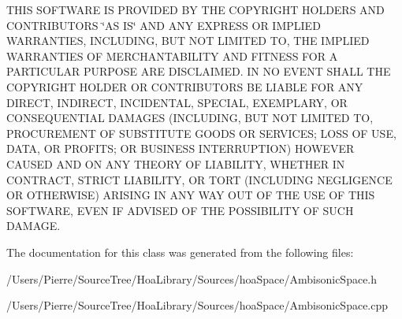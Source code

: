 T\-H\-I\-S S\-O\-F\-T\-W\-A\-R\-E I\-S P\-R\-O\-V\-I\-D\-E\-D B\-Y T\-H\-E C\-O\-P\-Y\-R\-I\-G\-H\-T H\-O\-L\-D\-E\-R\-S A\-N\-D C\-O\-N\-T\-R\-I\-B\-U\-T\-O\-R\-S \char`\"{}\-A\-S I\-S\char`\"{} A\-N\-D A\-N\-Y E\-X\-P\-R\-E\-S\-S O\-R I\-M\-P\-L\-I\-E\-D W\-A\-R\-R\-A\-N\-T\-I\-E\-S, I\-N\-C\-L\-U\-D\-I\-N\-G, B\-U\-T N\-O\-T L\-I\-M\-I\-T\-E\-D T\-O, T\-H\-E I\-M\-P\-L\-I\-E\-D W\-A\-R\-R\-A\-N\-T\-I\-E\-S O\-F M\-E\-R\-C\-H\-A\-N\-T\-A\-B\-I\-L\-I\-T\-Y A\-N\-D F\-I\-T\-N\-E\-S\-S F\-O\-R A P\-A\-R\-T\-I\-C\-U\-L\-A\-R P\-U\-R\-P\-O\-S\-E A\-R\-E D\-I\-S\-C\-L\-A\-I\-M\-E\-D. I\-N N\-O E\-V\-E\-N\-T S\-H\-A\-L\-L T\-H\-E C\-O\-P\-Y\-R\-I\-G\-H\-T H\-O\-L\-D\-E\-R O\-R C\-O\-N\-T\-R\-I\-B\-U\-T\-O\-R\-S B\-E L\-I\-A\-B\-L\-E F\-O\-R A\-N\-Y D\-I\-R\-E\-C\-T, I\-N\-D\-I\-R\-E\-C\-T, I\-N\-C\-I\-D\-E\-N\-T\-A\-L, S\-P\-E\-C\-I\-A\-L, E\-X\-E\-M\-P\-L\-A\-R\-Y, O\-R C\-O\-N\-S\-E\-Q\-U\-E\-N\-T\-I\-A\-L D\-A\-M\-A\-G\-E\-S (I\-N\-C\-L\-U\-D\-I\-N\-G, B\-U\-T N\-O\-T L\-I\-M\-I\-T\-E\-D T\-O, P\-R\-O\-C\-U\-R\-E\-M\-E\-N\-T O\-F S\-U\-B\-S\-T\-I\-T\-U\-T\-E G\-O\-O\-D\-S O\-R S\-E\-R\-V\-I\-C\-E\-S; L\-O\-S\-S O\-F U\-S\-E, D\-A\-T\-A, O\-R P\-R\-O\-F\-I\-T\-S; O\-R B\-U\-S\-I\-N\-E\-S\-S I\-N\-T\-E\-R\-R\-U\-P\-T\-I\-O\-N) H\-O\-W\-E\-V\-E\-R C\-A\-U\-S\-E\-D A\-N\-D O\-N A\-N\-Y T\-H\-E\-O\-R\-Y O\-F L\-I\-A\-B\-I\-L\-I\-T\-Y, W\-H\-E\-T\-H\-E\-R I\-N C\-O\-N\-T\-R\-A\-C\-T, S\-T\-R\-I\-C\-T L\-I\-A\-B\-I\-L\-I\-T\-Y, O\-R T\-O\-R\-T (I\-N\-C\-L\-U\-D\-I\-N\-G N\-E\-G\-L\-I\-G\-E\-N\-C\-E O\-R O\-T\-H\-E\-R\-W\-I\-S\-E) A\-R\-I\-S\-I\-N\-G I\-N A\-N\-Y W\-A\-Y O\-U\-T O\-F T\-H\-E U\-S\-E O\-F T\-H\-I\-S S\-O\-F\-T\-W\-A\-R\-E, E\-V\-E\-N I\-F A\-D\-V\-I\-S\-E\-D O\-F T\-H\-E P\-O\-S\-S\-I\-B\-I\-L\-I\-T\-Y O\-F S\-U\-C\-H D\-A\-M\-A\-G\-E. 

The documentation for this class was generated from the following files\-:\begin{DoxyCompactItemize}
\item 
/\-Users/\-Pierre/\-Source\-Tree/\-Hoa\-Library/\-Sources/hoa\-Space/Ambisonic\-Space.\-h\item 
/\-Users/\-Pierre/\-Source\-Tree/\-Hoa\-Library/\-Sources/hoa\-Space/Ambisonic\-Space.\-cpp\end{DoxyCompactItemize}
